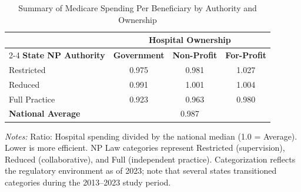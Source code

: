 \begin{table}[htbp]
    \centering
    \caption{Summary of Medicare Spending Per Beneficiary by Authority and Ownership}
    \label{tab:mspb_score}
    \vspace{0.2cm}
    \begin{tabular}{lccc}
        \toprule
        & \multicolumn{3}{c}{\textbf{Hospital Ownership}} \\
        \cmidrule(lr){2-4}
        \textbf{State NP Authority} & \textbf{Government} & \textbf{Non-Profit} & \textbf{For-Profit} \\
        \midrule
        Restricted & 0.975 & 0.981 & 1.027 \\
        Reduced & 0.991 & 1.001 & 1.004 \\
        Full Practice & 0.923 & 0.963 & 0.980 \\
        \midrule
        \textbf{National Average} & \multicolumn{3}{c}{0.987} \\
        \bottomrule
    \end{tabular}
    \vspace{0.1cm}
    \begin{minipage}{0.85\textwidth}
        \footnotesize \textit{Notes:} Ratio: Hospital spending divided by the national median (1.0 = Average). Lower is more efficient. NP Law categories represent Restricted (supervision), Reduced (collaborative), and Full (independent practice). Categorization reflects the regulatory environment as of 2023; note that several states transitioned categories during the 2013--2023 study period.
    \end{minipage}
\end{table}